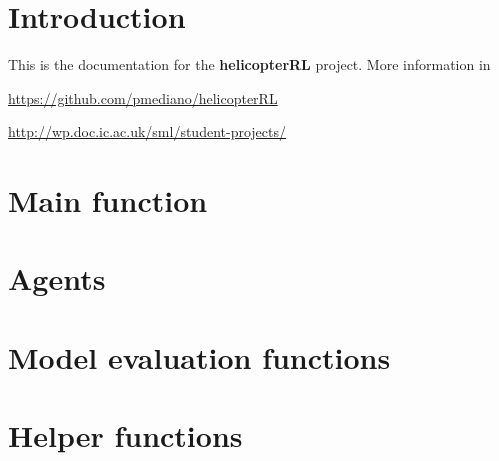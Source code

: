 \documentclass[a4paper,11pt]{article}
\begin{document}
\maketitle

\section{Introduction}

This is the documentation for the \textbf{helicopterRL} project. More information in

{\centering
\url{https://github.com/pmediano/helicopterRL}

\url{http://wp.doc.ic.ac.uk/sml/student-projects/}

}

\section{Main function}




\section{Agents}





\section{Model evaluation functions}







\section{Helper functions}






\end{document}
